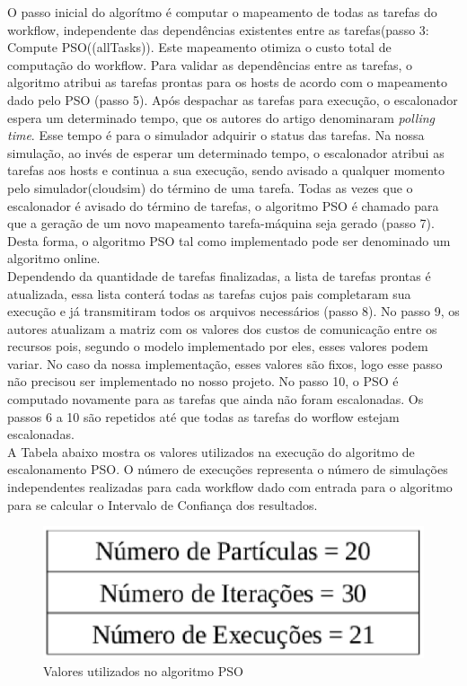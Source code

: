 \documentclass[a4paper,10pt]{article}
\begin{document}
O passo inicial do algorítmo é computar o mapeamento de todas as tarefas do workflow, independente das dependências
existentes entre as tarefas(passo 3: Compute PSO((allTasks)). Este mapeamento otimiza o custo total de computação do workflow. 
Para validar as dependências entre as tarefas, o algoritmo atribui as tarefas prontas para os hosts de acordo com o 
mapeamento dado pelo PSO (passo 5). Após despachar as tarefas para execução, o escalonador espera um determinado tempo, que
os autores do artigo denominaram \emph{polling time}. Esse tempo é para o simulador adquirir o status das tarefas.
Na nossa simulação, ao invés de esperar um determinado tempo, o escalonador atribui as tarefas aos hosts e continua a sua execução, sendo
avisado a qualquer momento pelo simulador(cloudsim) do término de uma tarefa. Todas as vezes que o escalonador é avisado do término de tarefas, 
o algoritmo PSO é chamado para que a geração de um novo mapeamento tarefa-máquina seja gerado (passo 7). Desta forma, o algoritmo PSO tal como
implementado pode ser denominado um algoritmo online.\\

Dependendo da quantidade de tarefas finalizadas, a lista de tarefas prontas é atualizada, essa lista conterá todas as tarefas 
cujos pais completaram sua execução e já transmitiram todos os arquivos necessários (passo 8). No passo 9, os autores 
atualizam a matriz com os valores dos custos de comunicação entre os recursos pois, segundo o modelo implementado por eles, 
esses valores podem variar. No caso da nossa implementação, esses valores são fixos, logo esse passo não precisou ser implementado 
no nosso projeto. No passo 10, o PSO é computado novamente para as tarefas que ainda não foram escalonadas. Os passos 6 a 10 
são repetidos até que todas as tarefas do worflow estejam escalonadas.\\

A Tabela abaixo mostra os valores utilizados na execução do algoritmo de escalonamento PSO. O número de execuções representa o número de 
simulações independentes realizadas para cada workflow dado com entrada para o algoritmo para se calcular o Intervalo de Confiança dos resultados.\\

\begin{figure}[!htb]
\centering
\includegraphics[scale=.4]{figures/valuesPSO.eps}
\caption{Valores utilizados no algoritmo PSO}
\label{psoValues}
\end{figure}
\end{document}
